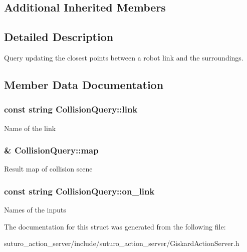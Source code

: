 \subsection*{Additional Inherited Members}


\subsection{Detailed Description}
Query updating the closest points between a robot link and the surroundings. 

\subsection{Member Data Documentation}
\hypertarget{structCollisionQuery_ad29d6393aec770b2975e5fe43f121ae1}{
\subsubsection[{link}]{\setlength{\rightskip}{0pt plus 5cm}const string Collision\-Query\-::link\hspace{0.3cm}{\ttfamily [private]}}}\label{structCollisionQuery_ad29d6393aec770b2975e5fe43f121ae1}
Name of the link \hypertarget{structCollisionQuery_a014c3155faa91f550e82d6cf70cc1670}{
\subsubsection[{map}]{\& Collision\-Query\-::map\hspace{0.3cm}{\ttfamily [private]}}}\label{structCollisionQuery_a014c3155faa91f550e82d6cf70cc1670}
Result map of collision scene \hypertarget{structCollisionQuery_a1f32be858524ab1886b7def2b5cfea69}{
\subsubsection[{on\-\_\-link}]{\setlength{\rightskip}{0pt plus 5cm}const string Collision\-Query\-::on\-\_\-link\hspace{0.3cm}{\ttfamily [private]}}}\label{structCollisionQuery_a1f32be858524ab1886b7def2b5cfea69}
Names of the inputs 

The documentation for this struct was generated from the following file\-:\begin{DoxyCompactItemize}
\item 
suturo\-\_\-action\-\_\-server/include/suturo\-\_\-action\-\_\-server/Giskard\-Action\-Server.\-h\end{DoxyCompactItemize}
